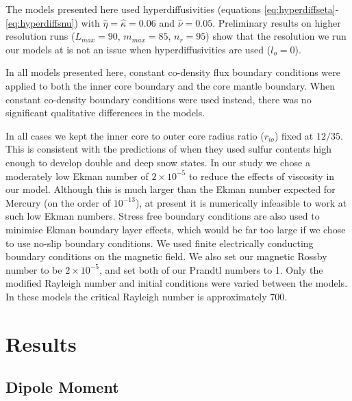 The models presented here used hyperdiffusivities (equations \ref{eq:hyperdiffseta}-\ref{eq:hyperdiffsnu}) with $\hat{\eta}=\hat{\kappa}=0.06$ and $\hat{\nu}=0.05$. Preliminary results on higher resolution runs ($L_{max}=90$, $m_{max}=85$, $n_{r}=95$) show that the resolution we run our models at is not an issue when hyperdiffusivities are used ($l_{o}=0$).

In all models presented here, constant co-density flux boundary conditions were applied to both the inner core boundary and the core mantle boundary. When constant co-density boundary conditions were used instead, there was no significant qualitative differences in the models. 

In all cases we kept the inner core to outer core radius ratio ($r_{io}$) fixed at $12/35$. This is consistent with the predictions of \citet{hauck04} when they used sulfur contents high enough to develop double and deep snow states. In our study we chose a moderately low Ekman number of $2\times10^{-5}$ to reduce the effects of viscosity in our model. Although this is much larger than the Ekman number expected for Mercury (on the order of $10^{-13}$), at present it is numerically infeasible to work at such low Ekman numbers. Stress free boundary conditions are also used to minimise Ekman boundary layer effects, which would be far too large if we chose to use no-slip boundary conditions. We used finite electrically conducting boundary conditions on the magnetic field. We also set our magnetic Rossby number to be $2\times10^{-5}$, and set both of our Prandtl numbers to 1. Only the modified Rayleigh number  and initial conditions were varied between the models. In these models the critical Rayleigh number is approximately $700$.

\section{Results}
\subsection{Dipole Moment}

